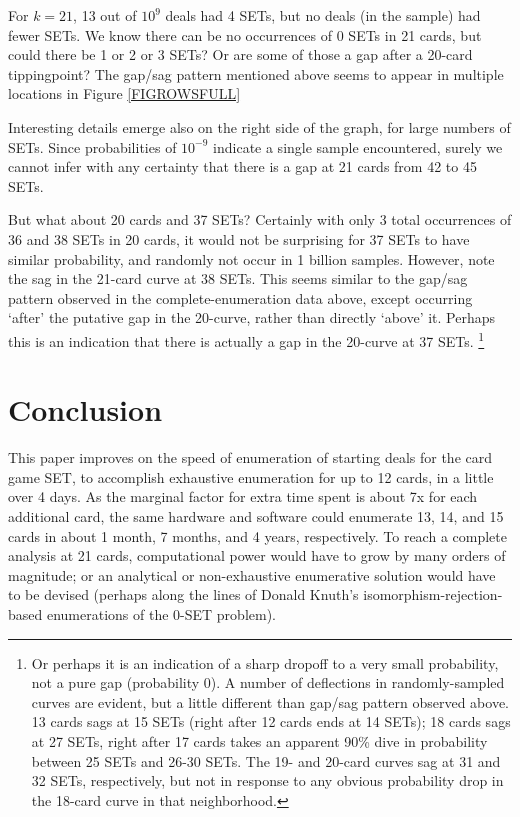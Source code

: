 \documentclass[10pt]{amsart}
\newcommand{\SET}{SET\texttrademark}  %
\begin{document}
For $k=21$, 13 out of $10^9$ deals had 4 SETs, but no deals (in the sample) had
fewer SETs. We know there can be no occurrences of 0 SETs in 21 cards, but could
there be 1 or 2 or 3 SETs? Or are some of those a gap after a 20-card
tipping\-point? The gap/sag pattern mentioned above seems to appear in multiple
locations in Figure \ref{FIGROWSFULL}

Interesting details emerge also on the right side of the graph, for large
numbers of SETs. Since probabilities of $10^{-9}$ indicate a single sample
encountered, surely we cannot infer with any certainty that there is a gap at 21
cards from 42 to 45 SETs.

But what about 20 cards and 37 SETs? Certainly with only 3 total occurrences of
36 and 38 SETs in 20 cards, it would not be surprising for 37 SETs to have
similar probability, and randomly not occur in 1 billion samples. However, note
the sag in the 21-card curve at 38 SETs. This seems similar to the gap/sag
pattern observed in the complete-enumeration data above, except occurring
`after' the putative gap in the 20-curve, rather than directly `above'
it. Perhaps this is an indication that there is actually a gap in the 20-curve
at 37 SETs.
\footnote{Or perhaps it is an indication of a sharp dropoff to a very small
  probability, not a pure gap (probability 0). A number of deflections in
  randomly-sampled curves are evident, but a little different than gap/sag
  pattern observed above.  13 cards sags at 15 SETs (right after 12 cards ends
  at 14 SETs); 18 cards sags at 27 SETs, right after 17 cards takes an apparent
  90\% dive in probability between 25 SETs and 26-30 SETs. The 19- and 20-card
  curves sag at 31 and 32 SETs, respectively, but not in response to any obvious
  probability drop in the 18-card curve in that neighborhood.}

\section{Conclusion}
This paper improves on the speed of enumeration of starting deals for the card
game \SET, to accomplish exhaustive enumeration for up to 12 cards, in a little
over 4 days. As the marginal factor for extra time spent is about 7x for each
additional card, the same hardware and software could enumerate 13, 14, and 15
cards in about 1 month, 7 months, and 4 years, respectively. To reach a complete
analysis at 21 cards, computational power would have to grow by many orders of
magnitude; or an analytical or non-exhaustive enumerative solution would have to
be devised (perhaps along the lines of Donald Knuth's
isomorphism-rejection-based enumerations of the 0-SET problem).
\end{document}
